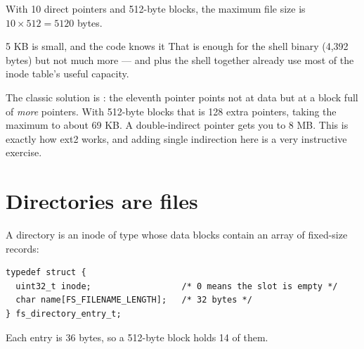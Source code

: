 With 10 direct pointers and 512-byte blocks, the maximum file size is $10 \times 512 = 5120$ bytes.

\begin{warn}{5 KB is small, and the code knows it}
That is enough for the shell binary (4,392 bytes) but not much more --- and  plus
the shell together already use most of the inode table's useful capacity.

The classic solution is : the eleventh pointer points not at data but at a
block full of \emph{more} pointers. With 512-byte blocks that is 128 extra pointers, taking the
maximum to about 69 KB. A double-indirect pointer gets you to 8 MB. This is exactly how ext2 works,
and adding single indirection here is a very instructive exercise.
\end{warn}

\section{Directories are files}

A directory is an inode of type  whose data blocks contain an array of
fixed-size records:

\begin{lstlisting}[style=c]
typedef struct {
  uint32_t inode;                  /* 0 means the slot is empty */
  char name[FS_FILENAME_LENGTH];   /* 32 bytes */
} fs_directory_entry_t;
\end{lstlisting}

Each entry is 36 bytes, so a 512-byte block holds 14 of them.

\begin{center}
\end{center}

